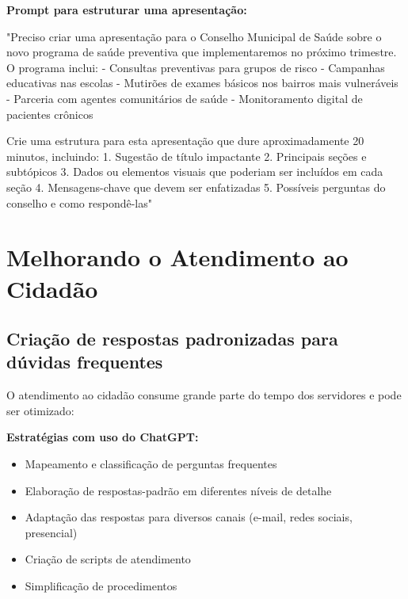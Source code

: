\documentclass[12pt,a4paper]{book}
\begin{document}
\begin{tcolorbox}[exemplo]
\textbf{Prompt para estruturar uma apresentação:}

"Preciso criar uma apresentação para o Conselho Municipal de Saúde sobre o novo programa de saúde preventiva que implementaremos no próximo trimestre. O programa inclui:
- Consultas preventivas para grupos de risco
- Campanhas educativas nas escolas
- Mutirões de exames básicos nos bairros mais vulneráveis
- Parceria com agentes comunitários de saúde
- Monitoramento digital de pacientes crônicos

Crie uma estrutura para esta apresentação que dure aproximadamente 20 minutos, incluindo:
1. Sugestão de título impactante
2. Principais seções e subtópicos
3. Dados ou elementos visuais que poderiam ser incluídos em cada seção
4. Mensagens-chave que devem ser enfatizadas
5. Possíveis perguntas do conselho e como respondê-las"
\end{tcolorbox}

\section{Melhorando o Atendimento ao Cidadão}

\subsection{Criação de respostas padronizadas para dúvidas frequentes}

O atendimento ao cidadão consume grande parte do tempo dos servidores e pode ser otimizado:

\textbf{Estratégias com uso do ChatGPT:}
\begin{itemize}
    \item Mapeamento e classificação de perguntas frequentes
    \item Elaboração de respostas-padrão em diferentes níveis de detalhe
    \item Adaptação das respostas para diversos canais (e-mail, redes sociais, presencial)
    \item Criação de scripts de atendimento
    \item Simplificação de procedimentos
\end{itemize}
\end{document}
